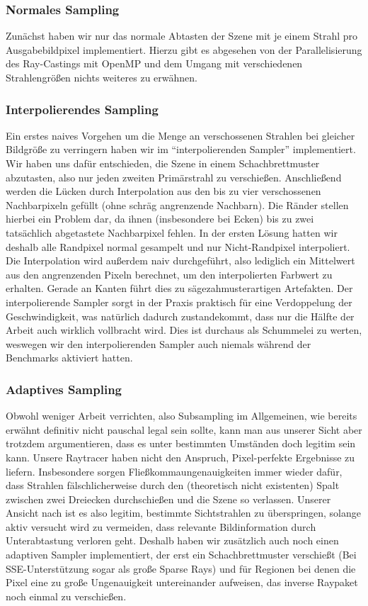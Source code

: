 \subsubsection{Normales Sampling}
Zunächst haben wir nur das normale Abtasten der Szene mit je einem Strahl pro Ausgabebildpixel implementiert.
Hierzu gibt es abgesehen von der Parallelisierung des Ray-Castings mit OpenMP und dem Umgang mit verschiedenen Strahlengrößen nichts weiteres zu erwähnen.

\subsubsection{Interpolierendes Sampling}
Ein erstes naives Vorgehen um die Menge an verschossenen Strahlen bei gleicher Bildgröße zu verringern haben wir im "`interpolierenden Sampler"' implementiert.
Wir haben uns dafür entschieden, die Szene in einem Schachbrettmuster abzutasten, also nur jeden zweiten Primärstrahl zu verschießen.
Anschließend werden die Lücken durch Interpolation aus den bis zu vier verschossenen Nachbarpixeln gefüllt (ohne schräg angrenzende Nachbarn).
Die Ränder stellen hierbei ein Problem dar, da ihnen (insbesondere bei Ecken) bis zu zwei tatsächlich abgetastete Nachbarpixel fehlen.
In der ersten Lösung hatten wir deshalb alle Randpixel normal gesampelt und nur Nicht-Randpixel interpoliert.
Die Interpolation wird außerdem naiv durchgeführt, also lediglich ein Mittelwert aus den angrenzenden Pixeln berechnet, um den interpolierten Farbwert zu erhalten.
Gerade an Kanten führt dies zu sägezahmusterartigen Artefakten.
Der interpolierende Sampler sorgt in der Praxis praktisch für eine Verdoppelung der Geschwindigkeit, was natürlich dadurch zustandekommt, dass nur die Hälfte der Arbeit auch wirklich vollbracht wird.
Dies ist durchaus als Schummelei zu werten, weswegen wir den interpolierenden Sampler auch niemals während der Benchmarks aktiviert hatten.

\subsubsection{Adaptives Sampling}
Obwohl weniger Arbeit verrichten, also Subsampling im Allgemeinen, wie bereits erwähnt definitiv nicht pauschal legal sein sollte, kann man aus unserer Sicht aber trotzdem argumentieren, dass es unter bestimmten Umständen doch legitim sein kann.
Unsere Raytracer haben nicht den Anspruch, Pixel-perfekte Ergebnisse zu liefern.
Insbesondere sorgen Fließkommaungenauigkeiten immer wieder dafür, dass Strahlen fälschlicherweise durch den (theoretisch nicht existenten) Spalt zwischen zwei Dreiecken durchschießen und die Szene so verlassen.
Unserer Ansicht nach ist es also legitim, bestimmte Sichtstrahlen zu überspringen, solange aktiv versucht wird zu vermeiden, dass relevante Bildinformation durch Unterabtastung verloren geht.
Deshalb haben wir zusätzlich auch noch einen adaptiven Sampler implementiert, der erst ein Schachbrettmuster verschießt (Bei SSE-Unterstützung sogar als große Sparse Rays) und für Regionen bei denen die Pixel eine zu große Ungenauigkeit untereinander aufweisen, das inverse Raypaket noch einmal zu verschießen.
